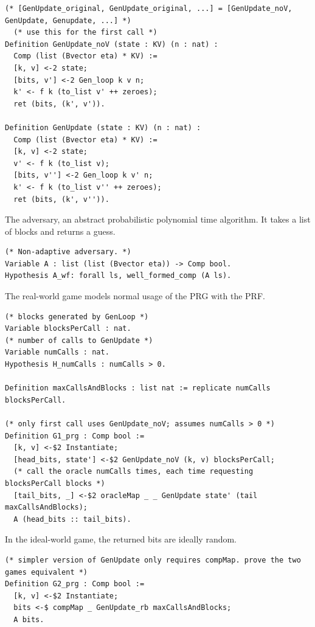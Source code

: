 \documentclass[12pt,lot, lof]{puthesis}
\begin{document}
{\begin{lstlisting}
(* [GenUpdate_original, GenUpdate_original, ...] = [GenUpdate_noV, GenUpdate, Genupdate, ...] *)
  (* use this for the first call *)
Definition GenUpdate_noV (state : KV) (n : nat) :
  Comp (list (Bvector eta) * KV) :=
  [k, v] <-2 state;
  [bits, v'] <-2 Gen_loop k v n;
  k' <- f k (to_list v' ++ zeroes);
  ret (bits, (k', v')).

Definition GenUpdate (state : KV) (n : nat) :
  Comp (list (Bvector eta) * KV) :=
  [k, v] <-2 state;
  v' <- f k (to_list v);
  [bits, v''] <-2 Gen_loop k v' n;
  k' <- f k (to_list v'' ++ zeroes);
  ret (bits, (k', v'')).
\end{lstlisting}

The adversary, an abstract probabilistic polynomial time algorithm. It takes a list of blocks and returns a guess.

\begin{lstlisting}
(* Non-adaptive adversary. *)
Variable A : list (list (Bvector eta)) -> Comp bool.
Hypothesis A_wf: forall ls, well_formed_comp (A ls).
\end{lstlisting}

The real-world game models normal usage of the PRG with the PRF.

\begin{lstlisting}
(* blocks generated by GenLoop *)
Variable blocksPerCall : nat.      
(* number of calls to GenUpdate *) 
Variable numCalls : nat.        
Hypothesis H_numCalls : numCalls > 0. 

Definition maxCallsAndBlocks : list nat := replicate numCalls blocksPerCall.

(* only first call uses GenUpdate_noV; assumes numCalls > 0 *)
Definition G1_prg : Comp bool :=
  [k, v] <-$2 Instantiate;
  [head_bits, state'] <-$2 GenUpdate_noV (k, v) blocksPerCall;
  (* call the oracle numCalls times, each time requesting blocksPerCall blocks *)
  [tail_bits, _] <-$2 oracleMap _ _ GenUpdate state' (tail maxCallsAndBlocks);
  A (head_bits :: tail_bits).
\end{lstlisting}

In the ideal-world game, the returned bits are ideally random.

\begin{lstlisting}
(* simpler version of GenUpdate only requires compMap. prove the two games equivalent *)
Definition G2_prg : Comp bool :=
  [k, v] <-$2 Instantiate;
  bits <-$ compMap _ GenUpdate_rb maxCallsAndBlocks;
  A bits.
\end{lstlisting}

}
\end{document}
